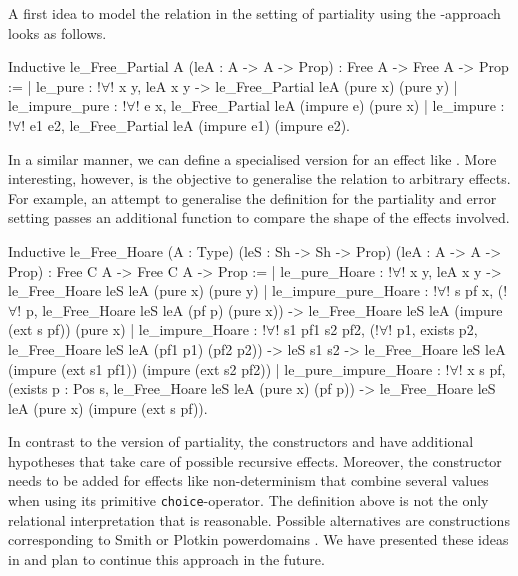 A first idea to model the relation in the setting of partiality using the \--approach looks as follows.

\begin{coqcode}
Inductive le_Free_Partial A (leA : A -> A -> Prop)
  : Free A -> Free A -> Prop :=
| le_pure : !$\forall$! x y, leA x y -> le_Free_Partial leA (pure x) (pure y)
| le_impure_pure : !$\forall$! e x, le_Free_Partial leA (impure e) (pure x)
| le_impure : !$\forall$! e1 e2, le_Free_Partial leA (impure e1) (impure e2).
\end{coqcode}

In a similar manner, we can define a specialised version for an effect like .
More interesting, however, is the objective to generalise the relation to arbitrary effects.
For example, an attempt to generalise the definition for the partiality and error setting passes an additional function to compare the shape of the effects involved.

\begin{coqcode}
Inductive le_Free_Hoare (A : Type) (leS : Sh -> Sh -> Prop)
    (leA : A -> A -> Prop) : Free C A -> Free C A -> Prop :=
| le_pure_Hoare : !$\forall$! x y,
    leA x y -> le_Free_Hoare leS leA (pure x) (pure y)
| le_impure_pure_Hoare : !$\forall$! s pf x,
    (!$\forall$! p, le_Free_Hoare leS leA (pf p) (pure x)) ->
      le_Free_Hoare leS leA (impure (ext s pf)) (pure x)
| le_impure_Hoare : !$\forall$! s1 pf1 s2 pf2,
    (!$\forall$! p1, exists p2, le_Free_Hoare leS leA (pf1 p1) (pf2 p2)) ->
    leS s1 s2 ->
    le_Free_Hoare leS leA (impure (ext s1 pf1)) (impure (ext s2 pf2))
| le_pure_impure_Hoare : !$\forall$! x s pf,
    (exists p : Pos s, le_Free_Hoare leS leA (pure x) (pf p)) ->
      le_Free_Hoare leS leA (pure x) (impure (ext s pf)).
\end{coqcode}

In contrast to the version of partiality, the constructors  and  have additional hypotheses that take care of possible recursive effects.
Moreover, the constructor  needs to be added for effects like non\--determinism that combine several values when using its primitive \texttt{choice}\--operator.
The definition above is not the only relational interpretation that is reasonable.
Possible alternatives are constructions corresponding to Smith or Plotkin powerdomains \citep{abramsky1994domain}.
We have presented these ideas in \citet{christiansen2019proving} and plan to continue this approach in the future.

